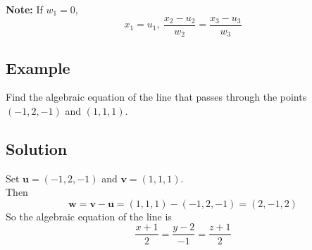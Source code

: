 \documentclass[11pt]{article}
\renewcommand{\vec}[1]{\mathbf{#1}}
\begin{document}
\textbf{Note:} If $w_1 = 0$,
\[ x_1=u_1,\ \frac{x_2 - u_2}{w_2} = \frac{x_3 - u_3}{w_3} \]

\subsection{Example}
Find the algebraic equation of the line that passes through the points $(-1, 2, -1)$ and $(1, 1, 1)$.

\subsection{Solution}
Set $\vec{u} = (-1, 2, -1)$ and $\vec{v} = (1, 1, 1)$.\\
Then
\[ \vec{w} = \vec{v} - \vec{u} = (1, 1, 1) - (-1, 2, -1) = (2, -1, 2) \]
So the algebraic equation of the line is
\[ \frac{x+1}{2} = \frac{y-2}{-1} = \frac{z+1}{2} \]
\end{document}
